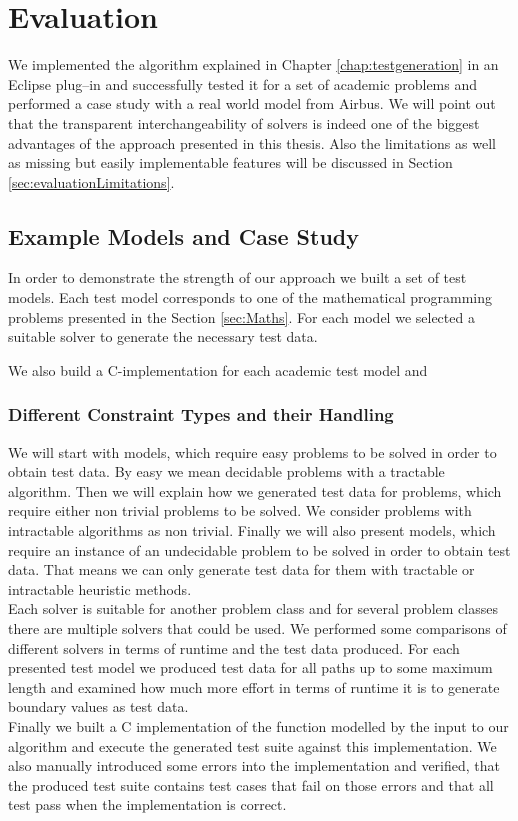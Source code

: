 \chapter{Evaluation}
\label{chap:evaluation}
We implemented the algorithm explained in Chapter \ref{chap:testgeneration} in an Eclipse plug--in and successfully tested it for a set of academic problems and performed a case study with a real world model from Airbus. We will point out that the transparent interchangeability of solvers is indeed one of the biggest advantages of the approach presented in this thesis. Also the limitations as well as missing but easily implementable features will be discussed in Section \ref{sec:evaluationLimitations}.
\section{Example Models and Case Study}
In order to demonstrate the strength of our approach we built a set of test models. Each test model corresponds to one of the mathematical programming problems presented in the  Section \ref{sec:Maths}. For each model we selected a suitable solver to generate the necessary test data. 

We also build a C-implementation for each academic test model and 
\subsection{Different Constraint Types and their Handling}
\label{sec:evaluationAcademicModels}
We will start with models, which require easy problems to be solved in order to obtain test data. By easy we mean decidable problems with a tractable algorithm. Then we will explain how we generated test data for problems, which require either non trivial problems to be solved. We consider problems with intractable algorithms as non trivial. Finally we will also present models, which require an instance of an undecidable problem to be solved in order to obtain test data. That means we can only generate test data for them with tractable or intractable heuristic methods.\\
Each solver is suitable for another problem class and for several problem classes there are multiple solvers that could be used. We performed some comparisons of different solvers in terms of runtime and the test data produced. For each presented test model we produced test data for all paths up to some maximum length and examined how much more effort in terms of runtime it is to generate boundary values as test data.\\
Finally we built a C implementation of the function modelled by the input to our algorithm and execute the generated test suite against this implementation. We also manually introduced some errors into the implementation and verified, that the produced test suite contains test cases that fail on those errors and that all test pass when the implementation is correct.
